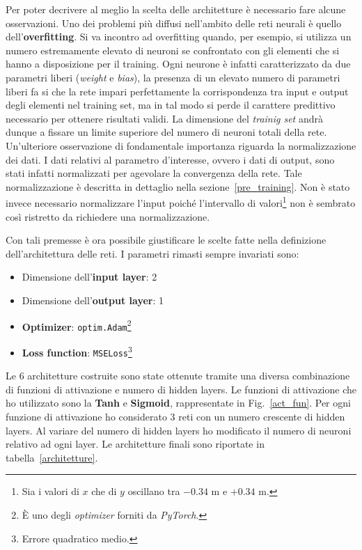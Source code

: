 \documentclass[12pt,a4paper,final]{book}
\begin{document}
Per poter decrivere al meglio la scelta delle architetture è necessario fare alcune osservazioni.
Uno dei problemi più diffusi nell'ambito delle reti neurali è quello dell'\textbf{overfitting}. Si va incontro ad overfitting quando, per esempio, si utilizza un numero estremamente elevato di neuroni se confrontato con gli elementi che si hanno a disposizione per il training.
Ogni neurone è infatti caratterizzato da due parametri liberi (\textit{weight} e \textit{bias}), la presenza di un elevato numero di parametri liberi fa si che la rete impari perfettamente la corrispondenza tra input e output degli elementi nel training set, ma in tal modo si perde il carattere predittivo necessario per ottenere risultati validi. La dimensione del \textit{trainig set} andrà dunque a fissare un limite superiore del numero di neuroni totali della rete.
Un'ulteriore osservazione di fondamentale importanza riguarda la normalizzazione dei dati. I dati relativi al parametro d'interesse, ovvero i dati di output, sono stati infatti normalizzati per agevolare la convergenza della rete. Tale normalizzazione è descritta in dettaglio nella sezione~\ref{pre_training}.
Non è stato invece necessario normalizzare l'input poiché l'intervallo di valori\footnote{Sia i valori di $x$ che di $y$ oscillano tra $-0.34$ \unit{m} e $+0.34$ \unit{m}.} non è sembrato così ristretto da richiedere una normalizzazione.


Con tali premesse è ora possibile giustificare le scelte fatte nella definizione dell'architettura delle reti. I parametri rimasti sempre invariati sono:
\begin{itemize}
	\item Dimensione dell'\textbf{input layer}: 2
	\item Dimensione dell'\textbf{output layer}: 1
	\item \textbf{Optimizer}: \texttt{optim.Adam}\footnote{\`E uno degli \textit{optimizer} forniti da \textit{PyTorch}.}
	\item \textbf{Loss function}: \texttt{MSELoss}\footnote{Errore quadratico medio.}
\end{itemize}
Le 6 architetture costruite sono state ottenute tramite una diversa combinazione di funzioni di attivazione e numero di hidden layers. Le funzioni di attivazione che ho utilizzato sono la \textbf{Tanh} e \textbf{Sigmoid}, rappresentate in Fig.~\ref{act_fun}. Per ogni funzione di attivazione ho considerato 3 reti con un numero crescente di hidden layers. Al variare del numero di hidden layers ho modificato il numero di neuroni relativo ad ogni layer. Le architetture finali sono riportate in tabella~\ref{architetture}.
\end{document}

